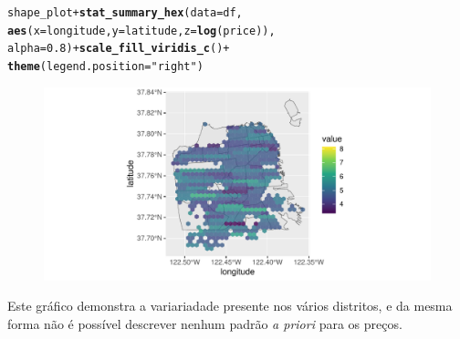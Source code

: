 \documentclass[justified, 11pt]{scrartcl}\usepackage[]{graphicx}\usepackage[]{xcolor}
\makeatletter
\def\maxwidth{ %
  \ifdim\Gin@nat@width>\linewidth
    \linewidth
  \else
    \Gin@nat@width
  \fi
}
\newcommand{\hlnum}[1]{\textcolor[rgb]{0.686,0.059,0.569}{#1}}%
\newcommand{\hlstr}[1]{\textcolor[rgb]{0.192,0.494,0.8}{#1}}%
\newcommand{\hlopt}[1]{\textcolor[rgb]{0,0,0}{#1}}%
\newcommand{\hlstd}[1]{\textcolor[rgb]{0.345,0.345,0.345}{#1}}%
\newcommand{\hlkwc}[1]{\textcolor[rgb]{0.333,0.667,0.333}{#1}}%
\newcommand{\hlkwd}[1]{\textcolor[rgb]{0.737,0.353,0.396}{\textbf{#1}}}%
\newenvironment{kframe}{%
 \def\at@end@of@kframe{}%
 \ifinner\ifhmode%
  \def\at@end@of@kframe{\end{minipage}}%
  \begin{minipage}{\columnwidth}%
 \fi\fi%
 \def\FrameCommand##1{\hskip\@totalleftmargin \hskip-\fboxsep
 \colorbox{shadecolor}{##1}\hskip-\fboxsep
     \hskip-\linewidth \hskip-\@totalleftmargin \hskip\columnwidth}%
 \MakeFramed {\advance\hsize-\width
   \@totalleftmargin\z@ \linewidth\hsize
   \@setminipage}}%
 {\par\unskip\endMakeFramed%
 \at@end@of@kframe}
\newenvironment{knitrout}{}{} %
\makeatother
\begin{document}
\begin{knitrout}
\color{fgcolor}\begin{kframe}
\begin{alltt}
\hlstd{shape_plot} \hlopt{+} \hlkwd{stat_summary_hex}\hlstd{(}\hlkwc{data} \hlstd{= df,}
  \hlkwd{aes}\hlstd{(}\hlkwc{x} \hlstd{= longitude,} \hlkwc{y} \hlstd{= latitude,} \hlkwc{z} \hlstd{=} \hlkwd{log}\hlstd{(price)),}
  \hlkwc{alpha} \hlstd{=} \hlnum{0.8}\hlstd{)} \hlopt{+} \hlkwd{scale_fill_viridis_c}\hlstd{()} \hlopt{+}
  \hlkwd{theme}\hlstd{(}\hlkwc{legend.position} \hlstd{=} \hlstr{"right"}\hlstd{)}
\end{alltt}


{\ttfamily\noindent\color{warningcolor}{\#\# Warning: Removed 3 rows containing non-finite values (`stat\_summary\_hex()`).}}\end{kframe}\begin{figure}
\includegraphics[width=\maxwidth]{figure/chunk-priceHexes-1} \end{figure}

\end{knitrout}

Este gráfico demonstra a variariadade presente nos vários distritos, e da mesma forma não é possível descrever nenhum padrão \textit{a priori} para os preços. \\
\end{document}

